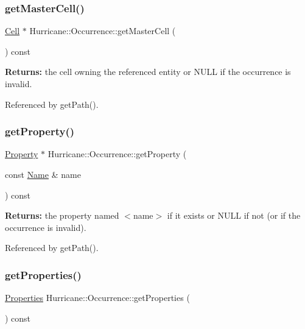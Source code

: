 \subsubsection{\texorpdfstring{get\+Master\+Cell()}{getMasterCell()}}
{\footnotesize\ttfamily \hyperlink{classHurricane_1_1Cell}{Cell} $\ast$ Hurricane\+::\+Occurrence\+::get\+Master\+Cell (\begin{DoxyParamCaption}{ }\end{DoxyParamCaption}) const}

{\bfseries Returns\+:} the cell owning the referenced entity or N\+U\+LL if the occurrence is invalid. 

Referenced by get\+Path().

\mbox{\label{classHurricane_1_1Occurrence_ab2b36b219037a2310f6527a35a9a266f}} 
\subsubsection{\texorpdfstring{get\+Property()}{getProperty()}}
{\footnotesize\ttfamily \hyperlink{classHurricane_1_1Property}{Property} $\ast$ Hurricane\+::\+Occurrence\+::get\+Property (\begin{DoxyParamCaption}\item[{const \hyperlink{classHurricane_1_1Name}{Name} \&}]{name }\end{DoxyParamCaption}) const}

{\bfseries Returns\+:} the property named {\ttfamily $<$name$>$} if it exists or N\+U\+LL if not (or if the occurrence is invalid). 

Referenced by get\+Path().

\mbox{\label{classHurricane_1_1Occurrence_acbf59d6c01804e01f66d076c149abb49}} 
\subsubsection{\texorpdfstring{get\+Properties()}{getProperties()}}
{\footnotesize\ttfamily \hyperlink{namespaceHurricane_afd7bca6dad4be54b7c03b0463e6c0004}{Properties} Hurricane\+::\+Occurrence\+::get\+Properties (\begin{DoxyParamCaption}{ }\end{DoxyParamCaption}) const}

